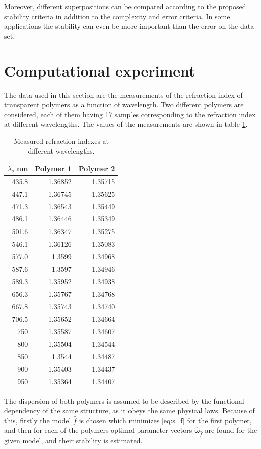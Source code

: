 \documentclass[11pt,a4paper]{article}
\theoremstyle{definition}
\begin{document}
Moreover, different superpositions can be compared according to the proposed
stability criteria in addition to the complexity and error criteria. In some
applications the stability can even be more important than the error on the
data set.

\section{Computational experiment}

The data used in this section are the measurements of the refraction index
of transparent polymers as a function of wavelength. Two different polymers
are considered, each of them having 17 samples corresponding to the
refraction index at different wavelengths. The values of the measurements
are shown in table \ref{tabl:source_data}.

\begin{table}[h]
  \footnotesize
  \caption{Measured refraction indexes at different wavelengths.}
  \centering
  \begin{tabular}{r | r | r}
	$\lambda$, nm	& Polymer 1 & Polymer 2 \\ \hline
	435.8 & 1.36852 & 1.35715 \\
	447.1 & 1.36745 & 1.35625 \\
	471.3 & 1.36543 & 1.35449 \\
	486.1 & 1.36446 & 1.35349 \\
	501.6 & 1.36347 & 1.35275 \\
	546.1 & 1.36126 & 1.35083 \\
	577.0 & 1.3599 & 1.34968 \\
	587.6 & 1.3597 & 1.34946 \\
	589.3 & 1.35952 & 1.34938 \\
	656.3 & 1.35767 & 1.34768 \\
	667.8 & 1.35743 & 1.34740 \\
	706.5 & 1.35652 & 1.34664 \\
	750 & 1.35587 & 1.34607 \\
	800 & 1.35504 & 1.34544 \\
	850 & 1.3544 & 1.34487 \\
	900 & 1.35403 & 1.34437 \\
	950 & 1.35364 & 1.34407 \\
  \end{tabular}
  \label{tabl:source_data}
\end{table}

The dispersion of both polymers is assumed to be described by the functional dependency
of the same structure, as it obeys the same physical laws. Because of this, firstly the
model $\hat{f}$ is chosen which minimizes \eqref{eq:s_f} for the first polymer, and then
for each of the polymers optimal parameter vectors $\hat{\boldsymbol{\omega}}_{\hat{f}}$
are found for the given model, and their stability is estimated.
\end{document}
